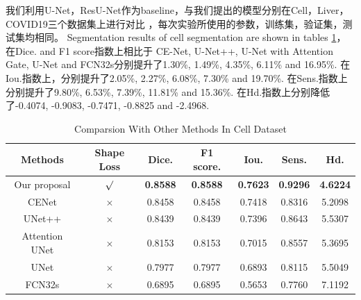 \documentclass[UTF8]{article} %
\begin{document}
我们利用U-Net，ResU-Net作为baseline，与我们提出的模型分别在Cell，Liver，COVID19三个数据集上进行对比
，每次实验所使用的参数，训练集，验证集，测试集均相同。
Segmentation results of cell segmentation are shown in tables \ref{cell-table}，在Dice. and F1 score指数上相比于
CE-Net, U-Net++, U-Net with Attention Gate, U-Net and FCN32s分别提升了1.30\%, 1.49\%, 4.35\%, 6.11\% and 16.95\%.
在Iou.指数上，分别提升了2.05\%, 2.27\%, 6.08\%, 7.30\% and 19.70\%. 在Sens.指数上分别提升了9.80\%, 6.53\%, 7.39\%, 
11.81\% and 15.36\%. 在Hd.指数上分别降低了-0.4074, -0.9083, -0.7471, -0.8825 and -2.4968.
  \begin{table}[H]
    \vspace{-2mm}
    \begin{center}\small
    \label{cell-table}
    \begin{tabular}{ccccccc}
      
    \toprule
    Methods & Shape Loss & Dice. & F1 score. & Iou. & Sens. & Hd.\\
    \midrule
      Our proposal & $\surd$ & \textbf{0.8588} & \textbf{0.8588} & \textbf{0.7623} & \textbf{0.9296} & \textbf{4.6224}\\
      CENet & $\times$ & 0.8458 & 0.8458 & 0.7418 & 0.8316 & 5.2098\\
      UNet++ & $\times$ & 0.8439 & 0.8439 & 0.7396 & 0.8643 & 5.5307\\
      Attention UNet & $\times$ & 0.8153 & 0.8153 & 0.7015 & 0.8557 & 5.3695\\
      UNet  & $\times$  & 0.7977 & 0.7977 & 0.6893 & 0.8115 & 5.5049\\
      FCN32s & $\times$ & 0.6895 & 0.6895 & 0.5653 & 0.7760 & 7.1192\\
  \bottomrule    
    \end{tabular}
    \caption{Comparsion With Other Methods In Cell\cite{dsb2018} Dataset}
  \end{center}
    \vspace{-4mm}
  \end{table}
\end{document}
